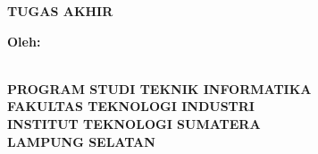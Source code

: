 \clearpage
\pagestyle{empty}

\begin{center}
	\smallskip
	
	\begin{center}
		\fontsize{16pt}{14pt}
		\bfseries \MakeUppercase{\thetitle}
		\vfill
	    \uppercase{Tugas Akhir}
	    \vfill
	\end{center}

	\large \bfseries Oleh:\\
    \large \bfseries \theauthor\\
    \printnim
    \vfill
    
    \begin{figure}[h]
    	\centering
    \end{figure}
    \vfill

	\begin{center}
		\fontsize{14pt}{16pt}
	    \bfseries
	    \uppercase{
	        Program Studi Teknik Informatika \\
	        Fakultas Teknologi Industri\\
	        Institut Teknologi Sumatera\\
	        Lampung Selatan
	    }\\
	    \the\year{}
    \end{center}

\end{center}

\clearpage
